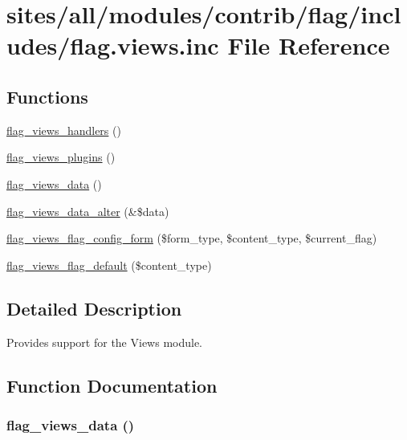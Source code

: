 \hypertarget{flag_8views_8inc}{
\section{sites/all/modules/contrib/flag/includes/flag.views.inc File Reference}
\label{flag_8views_8inc}
}
\subsection*{Functions}
\begin{CompactItemize}
\item 
\hyperlink{flag_8views_8inc_fda81baae0ede154b2d8717945b22c8e}{flag\_\-views\_\-handlers} ()
\item 
\hyperlink{flag_8views_8inc_20b8616140b3fe077b619b24b7c4eabd}{flag\_\-views\_\-plugins} ()
\item 
\hyperlink{flag_8views_8inc_1ec1d921a7db54457824563fa8e83b73}{flag\_\-views\_\-data} ()
\item 
\hyperlink{flag_8views_8inc_e0c74ad5be4bee80cc979f85745627df}{flag\_\-views\_\-data\_\-alter} (\&\$data)
\item 
\hyperlink{flag_8views_8inc_aa59ed9d07abe2c7daa77f794df9467d}{flag\_\-views\_\-flag\_\-config\_\-form} (\$form\_\-type, \$content\_\-type, \$current\_\-flag)
\item 
\hyperlink{flag_8views_8inc_e698abaaeb67252d5874ed5fd39c6284}{flag\_\-views\_\-flag\_\-default} (\$content\_\-type)
\end{CompactItemize}


\subsection{Detailed Description}
Provides support for the Views module. 

\subsection{Function Documentation}
\hypertarget{flag_8views_8inc_1ec1d921a7db54457824563fa8e83b73}{
\subsubsection[{flag\_\-views\_\-data}]{\setlength{\rightskip}{0pt plus 5cm}flag\_\-views\_\-data ()}}
\label{flag_8views_8inc_1ec1d921a7db54457824563fa8e83b73}


